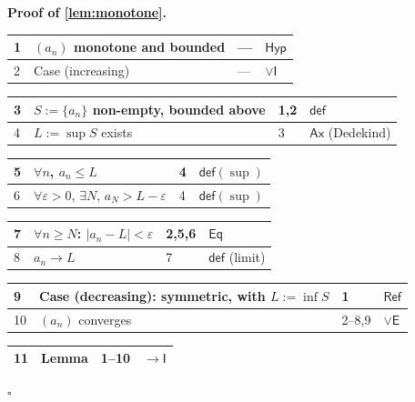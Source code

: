 \documentclass[11pt,reqno]{amsart}
\theoremstyle{blueplain}
\renewcommand{\qedsymbol}{\textcolor{proofqed}{\ensuremath{\square}}}
\renewenvironment{proof}[1][Proof]{\par\noindent\textbf{\textcolor{proofhead}{#1.}}\par\nobreak}{\par\nobreak\hfill\qedsymbol}
\numberwithin{equation}{section}
\begin{document}
\begin{proof}[\textbf{Proof of \cref{lem:monotone}}]
	\label{proof:lem:monotone}
	{\scriptsize
		\begin{tabular}{|m{0.7cm}|m{12cm}|m{1.4cm}|m{2.5cm}|}
			\hline
			1 & $(a_n)$ monotone and bounded & --- & $\mathsf{Hyp}$ \\ \hline
			2 & Case (increasing) & --- & $\vee\mathsf{I}$ \\
		\end{tabular}%
		\noindent \newline
		\noindent
		\begin{tabular}{|m{0.7cm}|m{12cm}|m{1.4cm}|m{2.5cm}|}
			\hline
			3 & $S:=\{a_n\}$ non-empty, bounded above & 1,2 & $\mathsf{def}$ \\ \hline
			4 & $L:=\sup S$ exists & 3 & $\mathsf{Ax}$ (Dedekind) \\
		\end{tabular}%
		\noindent \newline
		\noindent
		\begin{tabular}{|m{0.7cm}|m{12cm}|m{1.4cm}|m{2.5cm}|}
			\hline
			5 & $\forall n$, $a_n\le L$ & 4 & $\mathsf{def}(\sup)$ \\ \hline
			6 & $\forall\varepsilon>0$, $\exists N$, $a_N>L-\varepsilon$ & 4 & $\mathsf{def}(\sup)$ \\
		\end{tabular}%
		\noindent \newline
		\noindent
		\begin{tabular}{|m{0.7cm}|m{12cm}|m{1.4cm}|m{2.5cm}|}
			\hline
			7 & $\forall n\ge N$: $|a_n-L|<\varepsilon$ & 2,5,6 & $\mathsf{Eq}$ \\ \hline
			8 & $a_n\to L$ & 7 & $\mathsf{def}$ (limit) \\
		\end{tabular}%
		\noindent \newline
		\noindent
		\begin{tabular}{|m{0.7cm}|m{12cm}|m{1.4cm}|m{2.5cm}|}
			\hline
			9 & Case (decreasing): symmetric, with $L:=\inf S$ & 1 & $\mathsf{Ref}$ \\ \hline
			10 & $(a_n)$ converges & 2--8,9 & $\vee\mathsf{E}$ \\
		\end{tabular}%
		\noindent \newline
		\noindent
		\begin{tabular}{|m{0.7cm}|m{12cm}|m{1.4cm}|m{2.5cm}|}
			\hline
			11 & Lemma & 1--10 & $\rightarrow\mathsf{I}$ \\ \hline
		\end{tabular}%
	}
\end{proof}
\end{document}

